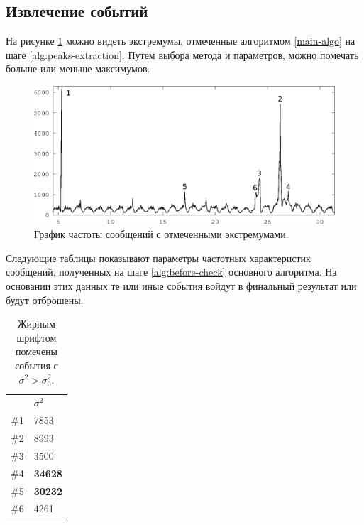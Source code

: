 \documentclass[12pt, a4paper]{article}
\newcommand\todo[1]{\marginpar{\textcolor{red}{#1}}}
\begin{document}
  \subsection{Извлечение событий}
  
	На рисунке \ref{fig:all-freq-labeled} можно видеть экстремумы, отмеченные алгоритмом \ref{main-algo} на шаге \ref{alg:peaks-extraction}. Путем выбора метода и параметров, можно помечать больше или меньше максимумов. 

	 \begin{figure}[H]
	  \centering
	  \label{fig:all-freq-labeled}
	  \includegraphics[width=15cm]{all-freq-labeled-1.eps}
	  \caption{График частоты сообщений с отмеченными экстремумами.}
	  \end{figure}
	  
	Следующие таблицы показывают параметры частотных характеристик сообщений, полученных на шаге \ref{alg:before-check} основного алгоритма. На основании этих данных те или иные события войдут в финальный результат или будут отброшены.
	
	\begin{table}[H]
	\centering
	\begin{tabular}{l | l}
	& $\sigma^2$ \\ 
	\#1 & 7853 \\ 
	\#2 & 8993 \\ 
	\#3 & 3500 \\ 
	\#4 & \textbf{34628} \\ 
	\#5 & \textbf{30232} \\ 
	\#6 & 4261 \\ 
	\end{tabular}
	\caption{Жирным шрифтом помечены события с $\sigma^2>\sigma_0^2$.}
	\label{sd-table}
	\end{table}
	
	
\end{document}
